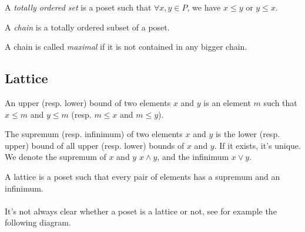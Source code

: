 \begin{definition}
  A \textit{totally ordered set} is a poset such that $\forall x,y \in P$, we have $x \le y$ or $y \le x$.
\end{definition}

\begin{definition}[Chain]
  A \textit{chain} is a totally ordered subset of a poset.
\end{definition}

\begin{definition}[Interval]
\end{definition}

\begin{definition}
  A chain is called \textit{maximal} if it is not contained in any bigger chain.
\end{definition}

\subsection{Lattice}

\begin{definition}
  An upper (resp. lower) bound of two elements $x$ and $y$ is an element $m$ such that $x \le m$ and $y \le m$ (resp. $m \le x$ and $m \le y$).
\end{definition}

\begin{definition}
  The supremum (resp. infinimum) of two elements $x$ and $y$ is the lower (resp. upper) bound of all upper (resp. lower) bounds of $x$ and $y$. If it exists, it's unique. We denote the supremum of $x$ and $y$ $x \wedge y$, and the infinimum $ x \vee y$.
\end{definition}

\begin{definition}[Lattice]
  A lattice is a poset such that every pair of elements has a supremum and an infinimum.
\end{definition}

\paragraph{}
It's not always clear whether a poset is a lattice or not, see for example the following diagram.

